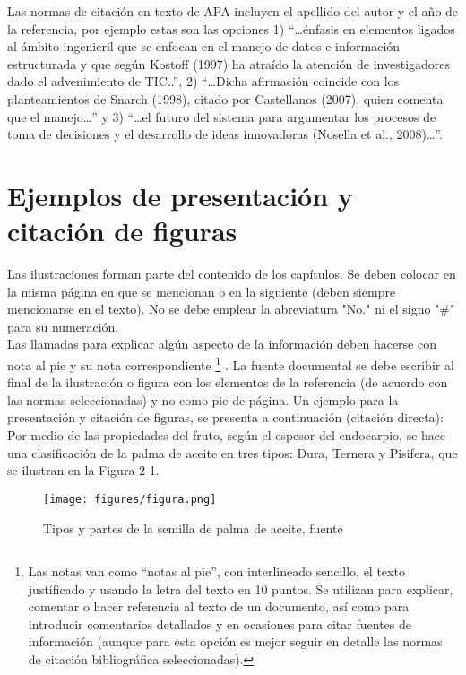 Las normas de citación en texto de APA incluyen el apellido del autor y el año de la referencia, por ejemplo estas son las opciones 1) “…énfasis en elementos ligados al ámbito ingenieril que se enfocan en el manejo de datos e información estructurada y que según Kostoff (1997) ha atraído la atención de investigadores dado el advenimiento de TIC..”, 2) “…Dicha afirmación coincide con los planteamientos de Snarch (1998), citado por Castellanos (2007), quien comenta que el manejo…” y 3)  “…el futuro del sistema para argumentar los procesos de toma de decisiones y el desarrollo de ideas innovadoras (Nosella et al., 2008)…”.\\


\section{Ejemplos de presentación y citación de figuras}

Las ilustraciones forman parte del contenido de los capítulos. Se deben colocar en la misma página en que se mencionan o en la siguiente (deben siempre mencionarse en el texto). No se debe emplear la abreviatura "No." ni el signo "\#" para su numeración. \\

Las llamadas para explicar algún aspecto de la información deben hacerse con nota al pie y su nota correspondiente \footnote{Las notas van como “notas al pie”, con interlineado sencillo, el texto justificado y usando la letra del texto en 10 puntos. Se utilizan para explicar, comentar o hacer referencia al texto de un documento, así como para introducir comentarios detallados y en ocasiones para citar fuentes de información (aunque para esta opción es mejor seguir en detalle las normas de citación bibliográfica seleccionadas).} . La fuente documental se debe escribir al final de la ilustración o figura con los elementos de la referencia (de acuerdo con las normas seleccionadas) y no como pie de página. Un ejemplo para la presentación y citación de figuras, se presenta a continuación (citación directa):\\

Por medio de las propiedades del fruto, según el espesor del endocarpio, se hace una clasificación de la palma de aceite en tres tipos: Dura, Ternera y Pisifera, que se ilustran en la Figura 2 1. \\


\begin{figure}[hbtp]
\centering
\texttt{[image: figures/figura.png]}
\caption{Tipos y partes de la semilla de  palma de aceite, fuente}
\cite{AG03p,AG04p}
\end{figure}





